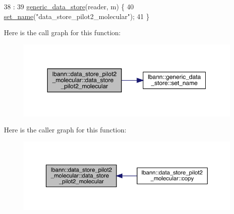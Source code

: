 \begin{DoxyCode}
38                                          :
39   \hyperlink{classlbann_1_1generic__data__store_acbcd88161c06f4bb9a70bbae857d4ee0}{generic\_data\_store}(reader, m) \{
40   \hyperlink{classlbann_1_1generic__data__store_a853741295a07b5687921fc56d0d7d5b2}{set\_name}(\textcolor{stringliteral}{"data\_store\_pilot2\_molecular"});
41 \}
\end{DoxyCode}
Here is the call graph for this function\+:\nopagebreak
\begin{figure}[H]
\begin{center}
\leavevmode
\includegraphics[width=343pt]{classlbann_1_1data__store__pilot2__molecular_a125dd5e8628bb97608bd8e4a7b7428ef_cgraph}
\end{center}
\end{figure}
Here is the caller graph for this function\+:\nopagebreak
\begin{figure}[H]
\begin{center}
\leavevmode
\includegraphics[width=350pt]{classlbann_1_1data__store__pilot2__molecular_a125dd5e8628bb97608bd8e4a7b7428ef_icgraph}
\end{center}
\end{figure}
\mbox{\label{classlbann_1_1data__store__pilot2__molecular_a00cabec3193c88d5317da61b8277587f}} 
